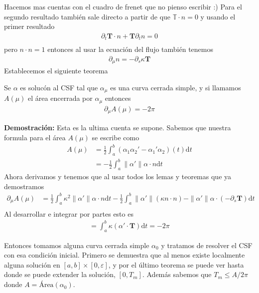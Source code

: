 \documentclass{article}
\theoremstyle{mytheoremstyle}
\theoremstyle{mytheoremstyle}
\theoremstyle{myproblemstyle}
\begin{document}
Hacemos mas cuentas con el cuadro de frenet que no pienso escribir :) Para el segundo resultado también sale directo a partir de que $\mathbb{T}\cdot n =0$ y usando el primer resultado 
\begin{align}
  \partial_t \bm{T} \cdot n + \bm{T}\partial_t n =0 \\ 
\end{align}
pero $n\cdot n=1$ entonces al usar la ecuación del flujo también tenemos
\begin{align}
  \partial_\mu n = - \partial_s \kappa \bm{T}
\end{align}
    Establecemos el siguiente teorema \newpage

    \begin{theorem}[]
      Se $\alpha$ es solucón al CSF tal que $\alpha_\mu$ es una curva cerrada simple, y si llamamos $A(\mu)$ el área encerrada por $\alpha_\mu$ entonces 
      \begin{align}
        \partial_\mu A(\mu) = -2\pi 
      \end{align}
    \end{theorem}

    \textbf{Demostración: } Esta es la ultima cuenta se supone.
    Sabemos que nuestra formula para el área $A(\mu)$ se escribe como 
    \begin{align}
      A(\mu)&=\frac{1}{2} \int_{a}^{b} (\alpha_1 \alpha_2 ' -\alpha_1'\alpha_2)(t)\mathrm{d} t \\ 
            &=-\frac{1}{2}\int_{a}^{b}\|\alpha'\| \alpha \cdot n \mathrm{d} t 
    \end{align}
    Ahora derivamos y tenemos que al usar todos los lemas y teoremas que ya demostramos
    \begin{align}
      \partial_\mu A(\mu)&= \frac{1}{2}\int_{a}^{b}\kappa^2\|\alpha'\| \alpha\cdot n \mathrm{d} t -\frac{1}{2} \int_{a}^{b} \|\alpha'\|(\kappa n\cdot n)- \|\alpha'\|\alpha \cdot (-\partial_s \bm{T})\mathrm{d} t \\
    \end{align}
     Al desarrollar e integrar por partes esto es 
     \begin{align}
       =\int_a^b\kappa(\alpha'\cdot \bm{T})\mathrm{d} t= -2\pi
      \end{align}

      Entonces tomamos alguna curva cerrada simple $\alpha_0$ y tratamos de resolver el CSF con esa condición inicial. Primero se demuestra que al menos existe localmente alguna solución en $[a,b]\times [0,\varepsilon]$, y por el último teorema se puede ver hasta donde se puede extender la solución, $[0,T_m]$. Además sabemos que $T_m \leq A/2\pi$ donde $A= \text{Área}(\alpha_0)$.
\end{document}

